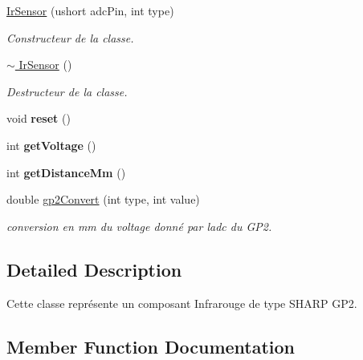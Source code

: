 \begin{DoxyCompactItemize}
\mbox{\label{classIrSensor_a0d5d176c61d573ac8a10c9c3131af1c7}} 
\hyperlink{classIrSensor_a0d5d176c61d573ac8a10c9c3131af1c7}{Ir\+Sensor} (ushort adc\+Pin, int type)
\begin{DoxyCompactList}\small\item\em Constructeur de la classe. \end{DoxyCompactList}\item 
\mbox{\label{classIrSensor_ac975f80f34589a4546608e95165185c5}} 
\hyperlink{classIrSensor_ac975f80f34589a4546608e95165185c5}{$\sim$ Ir\+Sensor} ()
\begin{DoxyCompactList}\small\item\em Destructeur de la classe. \end{DoxyCompactList}\item 
\mbox{\label{classIrSensor_a3bfb022e619ad8ba71adb93b8e27a605}} 
void {\bfseries reset} ()
\item 
\mbox{\label{classIrSensor_ad96797601d8975a891996bb19ac7bea6}} 
int {\bfseries get\+Voltage} ()
\item 
\mbox{\label{classIrSensor_a5c391d7b0c385a748d2441e56a624498}} 
int {\bfseries get\+Distance\+Mm} ()
\item 
\mbox{\label{classIrSensor_ade39a20d2ec88e9ad4686e062093c91d}} 
double \hyperlink{classIrSensor_ade39a20d2ec88e9ad4686e062093c91d}{gp2\+Convert} (int type, int value)
\begin{DoxyCompactList}\small\item\em conversion en mm du voltage donné par l\textquotesingle{}adc du G\+P2. \end{DoxyCompactList}\end{DoxyCompactItemize}


\subsection{Detailed Description}
Cette classe représente un composant Infrarouge de type S\+H\+A\+RP G\+P2. 

\subsection{Member Function Documentation}
\mbox{\label{classIrSensor_ade39a20d2ec88e9ad4686e062093c91d}} 
